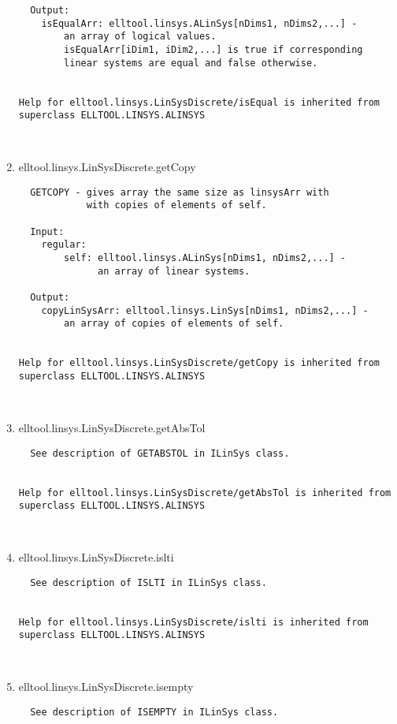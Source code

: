 \begin{enumerate}
\begin{lstlisting}
  Output:
    isEqualArr: elltool.linsys.ALinSys[nDims1, nDims2,...] -
        an array of logical values.
        isEqualArr[iDim1, iDim2,...] is true if corresponding
        linear systems are equal and false otherwise.


Help for elltool.linsys.LinSysDiscrete/isEqual is inherited from superclass ELLTOOL.LINSYS.ALINSYS



\end{lstlisting}
\fontfamily{\familydefault}
\selectfont
\item {elltool.linsys.LinSysDiscrete.getCopy}
\selectfont
\begin{lstlisting}
  GETCOPY - gives array the same size as linsysArr with
            with copies of elements of self.

  Input:
    regular:
        self: elltool.linsys.ALinSys[nDims1, nDims2,...] -
              an array of linear systems.

  Output:
    copyLinSysArr: elltool.linsys.LinSys[nDims1, nDims2,...] -
        an array of copies of elements of self.


Help for elltool.linsys.LinSysDiscrete/getCopy is inherited from superclass ELLTOOL.LINSYS.ALINSYS



\end{lstlisting}
\fontfamily{\familydefault}
\selectfont
\item {elltool.linsys.LinSysDiscrete.getAbsTol}
\selectfont
\begin{lstlisting}
  See description of GETABSTOL in ILinSys class.


Help for elltool.linsys.LinSysDiscrete/getAbsTol is inherited from superclass ELLTOOL.LINSYS.ALINSYS



\end{lstlisting}
\fontfamily{\familydefault}
\selectfont
\item {elltool.linsys.LinSysDiscrete.islti}
\selectfont
\begin{lstlisting}
  See description of ISLTI in ILinSys class.


Help for elltool.linsys.LinSysDiscrete/islti is inherited from superclass ELLTOOL.LINSYS.ALINSYS



\end{lstlisting}
\fontfamily{\familydefault}
\selectfont
\item {elltool.linsys.LinSysDiscrete.isempty}
\selectfont
\begin{lstlisting}
  See description of ISEMPTY in ILinSys class.



\end{lstlisting}
\end{enumerate}
